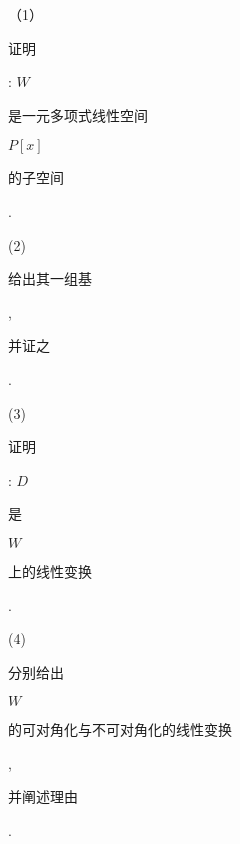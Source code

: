 \documentclass[10pt]{article}
\begin{document}
（1）\begin{CJK}{UTF8}{mj}证明\end{CJK}: $W$ \begin{CJK}{UTF8}{mj}是一元多项式线性空间\end{CJK} $P[x]$ \begin{CJK}{UTF8}{mj}的子空间\end{CJK}.

(2) \begin{CJK}{UTF8}{mj}给出其一组基\end{CJK}, \begin{CJK}{UTF8}{mj}并证之\end{CJK}.

(3) \begin{CJK}{UTF8}{mj}证明\end{CJK}: $D$ \begin{CJK}{UTF8}{mj}是\end{CJK} $W$ \begin{CJK}{UTF8}{mj}上的线性变换\end{CJK}.

(4) \begin{CJK}{UTF8}{mj}分别给出\end{CJK} $W$ \begin{CJK}{UTF8}{mj}的可对角化与不可对角化的线性变换\end{CJK}, \begin{CJK}{UTF8}{mj}并阐述理由\end{CJK}.
\end{document}
